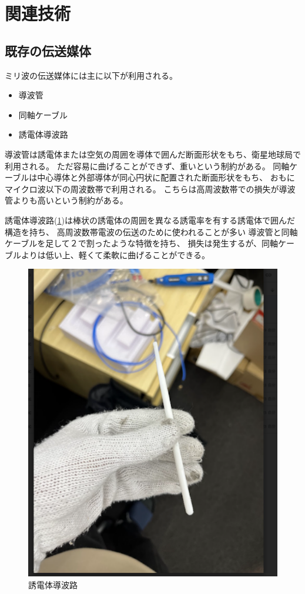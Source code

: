 \documentclass[technicalreport]{ieicej}
\begin{document}
\section{関連技術}

\subsection{既存の伝送媒体}

ミリ波の伝送媒体には主に以下が利用される。
\begin{itemize}
  \item 導波管
  \item 同軸ケーブル
  \item 誘電体導波路
\end{itemize}

導波管は誘電体または空気の周囲を導体で囲んだ断面形状をもち、衛星地球局で利用される。
ただ容易に曲げることができず、重いという制約がある。
同軸ケーブルは中心導体と外部導体が同心円状に配置された断面形状をもち、
おもにマイクロ波以下の周波数帯で利用される。
こちらは高周波数帯での損失が導波管よりも高いという制約がある。

誘電体導波路(\ref{fig:dielectric_waveguide})は棒状の誘電体の周囲を異なる誘電率を有する誘電体で囲んだ構造を持ち、
高周波数帯電波の伝送のために使われることが多い
導波管と同軸ケーブルを足して２で割ったような特徴を持ち、
損失は発生するが、同軸ケーブルよりは低い上、軽くて柔軟に曲げることができる。


\begin{figure}[tb]
  \begin{center}
    \includegraphics[bb=0 0 311 384, width=0.5\linewidth]{img/waveguide.pdf}
    \caption{誘電体導波路}
    \label{fig:dielectric_waveguide}
  \end{center}
\end{figure}
\end{document}

